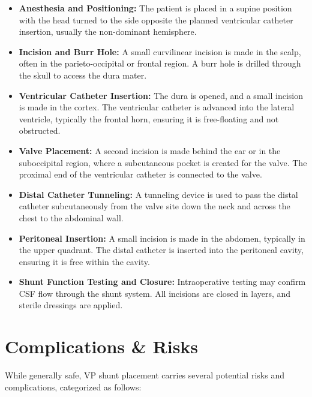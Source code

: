 \begin{itemize}
  \item \textbf{Anesthesia and Positioning:} The patient is placed in a supine position with the head turned to the side opposite the planned ventricular catheter insertion, usually the non-dominant hemisphere.
  
  \item \textbf{Incision and Burr Hole:} A small curvilinear incision is made in the scalp, often in the parieto-occipital or frontal region. A burr hole is drilled through the skull to access the dura mater.
  
  \item \textbf{Ventricular Catheter Insertion:} The dura is opened, and a small incision is made in the cortex. The ventricular catheter is advanced into the lateral ventricle, typically the frontal horn, ensuring it is free-floating and not obstructed.
  
  \item \textbf{Valve Placement:} A second incision is made behind the ear or in the suboccipital region, where a subcutaneous pocket is created for the valve. The proximal end of the ventricular catheter is connected to the valve.
  
  \item \textbf{Distal Catheter Tunneling:} A tunneling device is used to pass the distal catheter subcutaneously from the valve site down the neck and across the chest to the abdominal wall.
  
  \item \textbf{Peritoneal Insertion:} A small incision is made in the abdomen, typically in the upper quadrant. The distal catheter is inserted into the peritoneal cavity, ensuring it is free within the cavity.
  
  \item \textbf{Shunt Function Testing and Closure:} Intraoperative testing may confirm CSF flow through the shunt system. All incisions are closed in layers, and sterile dressings are applied.
\end{itemize}

\section*{Complications \& Risks}
While generally safe, VP shunt placement carries several potential risks and complications, categorized as follows:

